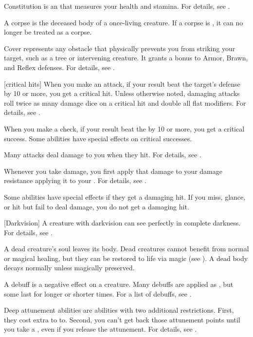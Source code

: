  Constitution is an  that measures your health and stamina.
For details, see .

 A corpse is the deceased body of a once-living creature.
If a corpse is , it can no longer be treated as a corpse.

 Cover represents any obstacle that physically prevents you from striking your target, such as a tree or intervening creature.
It grants a  bonus to Armor, Brawn, and Reflex defenses.
For details, see .

[critical hits] When you make an attack, if your result beat the target's defense by 10 or more, you get a critical hit.
Unless otherwise noted, damaging attacks roll twice as many damage dice on a critical hit and double all flat modifiers.
For details, see .

 When you make a check, if your result beat the  by 10 or more, you get a critical success.
Some abilities have special effects on critical successes.

 Many attacks deal damage to you when they hit.
For details, see .

 Whenever you take damage, you first apply that damage to your damage resistance applying it to your .
For details, see .

 Some abilities have special effects if they get a damaging hit.
If you miss, glance, or hit but fail to deal damage, you do not get a damaging hit.

[Darkvision] A creature with darkvision can see perfectly in complete darkness.
For details, see .

 A dead creature's soul leaves its body. Dead creatures cannot benefit from normal or magical healing, but they can be restored to life via magic (see ). A dead body decays normally unless magically preserved.

 A debuff is a negative effect on a creature.
Many debuffs are applied as , but some last for longer or shorter times.
For a list of debuffs, see .

 Deep attunement abilities are  abilities with two additional restrictions.
First, they cost extra  to  to.
Second, you can't get back those attunement points until you take a , even if you release the attunement.
For details, see .

